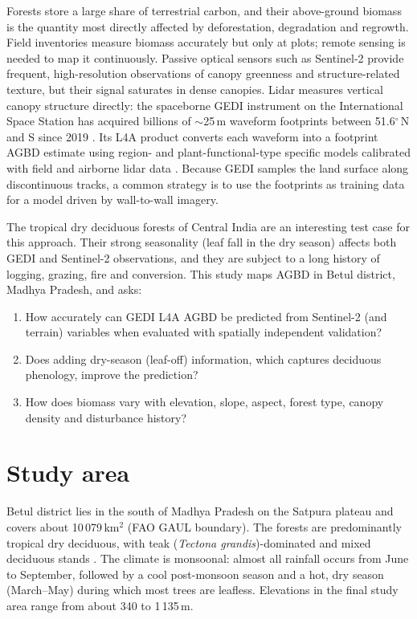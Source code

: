 \documentclass[11pt,a4paper]{article}
\begin{document}
Forests store a large share of terrestrial carbon, and their above-ground biomass is the
quantity most directly affected by deforestation, degradation and regrowth. Field inventories
measure biomass accurately but only at plots; remote sensing is needed to map it
continuously. Passive optical sensors such as Sentinel-2 provide frequent, high-resolution
observations of canopy greenness and structure-related texture, but their signal saturates in
dense canopies. Lidar measures vertical canopy structure directly: the spaceborne GEDI
instrument on the International Space Station has acquired billions of $\sim$25\,m waveform
footprints between 51.6$^\circ$\,N and S since 2019 \citep{dubayah2020}. Its L4A product
converts each waveform into a footprint AGBD estimate using region- and plant-functional-type
specific models calibrated with field and airborne lidar data \citep{kellner2023, dubayah2022}.
Because GEDI samples the land surface along discontinuous tracks, a common strategy is to use
the footprints as training data for a model driven by wall-to-wall imagery.

The tropical dry deciduous forests of Central India are an interesting test case for this
approach. Their strong seasonality (leaf fall in the dry season) affects both GEDI and
Sentinel-2 observations, and they are subject to a long history of logging, grazing, fire and
conversion. This study maps AGBD in Betul district, Madhya Pradesh, and asks:
\begin{enumerate}
  \item How accurately can GEDI L4A AGBD be predicted from Sentinel-2 (and terrain) variables
        when evaluated with spatially independent validation?
  \item Does adding dry-season (leaf-off) information, which captures deciduous phenology,
        improve the prediction?
  \item How does biomass vary with elevation, slope, aspect, forest type, canopy density and
        disturbance history?
\end{enumerate}

\section{Study area}

Betul district lies in the south of Madhya Pradesh on the Satpura plateau and covers about
10\,079\,km$^2$ (FAO GAUL boundary). The forests are predominantly tropical dry deciduous,
with teak (\textit{Tectona grandis})-dominated and mixed deciduous stands
\citep{championseth1968}. The climate is monsoonal: almost all rainfall occurs from June to
September, followed by a cool post-monsoon season and a hot, dry season (March--May) during
which most trees are leafless. Elevations in the final study area range from about 340 to
1\,135\,m.
\end{document}
